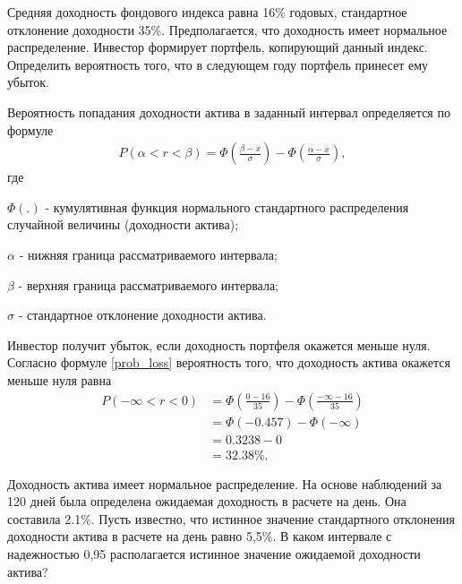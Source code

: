 \documentclass[12pt, table, twoside, a4paper]{exam}
\begin{document}
\begin{questions}
\begin{subparts}
\end{subparts}
\addpoints
	
	\question[5] Средняя доходность фондового индекса равна 16\% годовых, стандартное отклонение доходности 35\%. Предполагается, что доходность имеет нормальное распределение. Инвестор формирует портфель, копирующий данный индекс. Определить вероятность того, что в следующем году портфель принесет ему убыток.
	
	\begin{solution}[6em]
		
		\raggedright
		Вероятность   попадания   доходности   актива   в   заданный интервал определяется по формуле 
		\begin{align}
		\label{prob_loss}
		P(\alpha<r<\beta)=\Phi\left(\frac{\beta-\overline{x}}{\sigma}\right)-\Phi\left(\frac{\alpha-\overline{x}}{\sigma}\right),
		\end{align}
		где 
		
		$\Phi(.) $ - кумулятивная функция нормального стандартного распределения случайной величины (доходности актива);
		
		$\alpha $ - нижняя граница рассматриваемого интервала;
		
		$\beta $ - верхняя граница рассматриваемого интервала;
		
		$\sigma $ - стандартное отклонение доходности актива.
		
		Инвестор получит убыток, если доходность портфеля окажется меньше нуля. Согласно формуле \eqref{prob_loss} вероятность того, что доходность актива окажется меньше нуля равна
		\begin{align*}
		P(-\infty<r<0)&=\Phi\left(\frac{0-16}{35}\right)-\Phi\left(\frac{-\infty-16}{35}\right)\\
		&=\Phi(-0.457)-\Phi(-\infty)\\
		&=0.3238-0\\
		&=32.38\%.
		\end{align*}
	\end{solution}
	
	\addpoints
	
	\question[10] Доходность актива имеет нормальное распределение. На основе наблюдений за 120 дней была определена ожидаемая доходность в расчете на день. Она составила 2.1\%. Пусть известно, что истинное значение стандартного отклонения доходности актива в расчете на день равно 5,5\%. В каком интервале с надежностью 0,95 располагается истинное значение ожидаемой доходности актива?
	
	\begin{solution}[8em]
		

\end{solution}
\end{questions}
\end{document}
